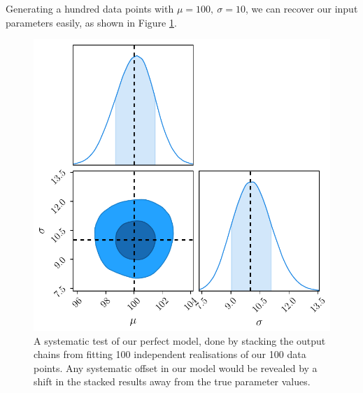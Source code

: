 \documentclass[a4paper,fleqn,usenatbib]{mnras}
\begin{document}
Generating a hundred data points with $\mu=100,\ \sigma=10$, we can recover our input parameters easily, as shown in Figure \ref{fig:perfect}.
\begin{figure}
	\begin{center}
		\includegraphics[width=\columnwidth]{example/perfect.pdf}
	\end{center}
	\caption{A systematic test of our perfect model, done by stacking the output chains from fitting 100 independent realisations of our 100 data points. Any systematic offset in our model would be revealed by a shift in the stacked results away from the true parameter values.}
	\label{fig:perfect}
\end{figure}
\end{document}

